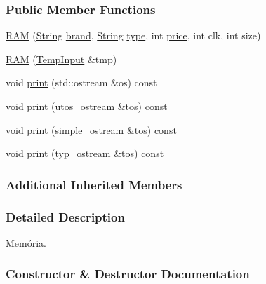 \subsubsection*{Public Member Functions}
\begin{DoxyCompactItemize}
\item 
\mbox{\hyperlink{class_r_a_m_a1869d6bd505e7fb58b809270626c82f2}{R\+AM}} (\mbox{\hyperlink{class_string}{String}} \mbox{\hyperlink{class_part_ae06f2fdeb7fbbdb229a7aca151f3e341}{brand}}, \mbox{\hyperlink{class_string}{String}} \mbox{\hyperlink{class_part_a101dbcc5c4b21564df7414c7eb0eae88}{type}}, int \mbox{\hyperlink{class_part_a8e71223aed1da95a974f33d8d6c91bb1}{price}}, int clk, int size)
\item 
\mbox{\hyperlink{class_r_a_m_afbdf895c5aa8cfce8f24197b89a9d82d}{R\+AM}} (\mbox{\hyperlink{struct_temp_input}{Temp\+Input}} \&tmp)
\item 
void \mbox{\hyperlink{class_r_a_m_a2f226659cbc23f841d73525572ba9574}{print}} (std\+::ostream \&os) const
\item 
void \mbox{\hyperlink{class_r_a_m_a11a874dd6cf99454efd6b7a1d20a3737}{print}} (\mbox{\hyperlink{structutos__ostream}{utos\+\_\+ostream}} \&tos) const
\item 
void \mbox{\hyperlink{class_r_a_m_ac2d5a8bd858289b6679e429bbe15fb20}{print}} (\mbox{\hyperlink{structsimple__ostream}{simple\+\_\+ostream}} \&tos) const
\item 
void \mbox{\hyperlink{class_r_a_m_ad43f71c742f078c98ab7fd9a26420c97}{print}} (\mbox{\hyperlink{structtyp__ostream}{typ\+\_\+ostream}} \&tos) const
\end{DoxyCompactItemize}
\subsubsection*{Additional Inherited Members}


\subsubsection{Detailed Description}
Memória. 

\subsubsection{Constructor \& Destructor Documentation}
\mbox{\label{class_r_a_m_a1869d6bd505e7fb58b809270626c82f2}} 
